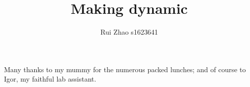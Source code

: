 \documentclass[msc,cs,logo,abbrevs,11pt]{infthesis}
\title{Making \dpy dynamic}
\author{Rui Zhao s1623641}
\begin{document}
\begin{preliminary}
\maketitle

\begin{acknowledgements}
Many thanks to my mummy for the numerous packed lunches; and of course to
Igor, my faithful lab assistant.
\end{acknowledgements}

\standarddeclaration


\tableofcontents


\end{preliminary}



	





	

	

	




%

%





\end{document}
